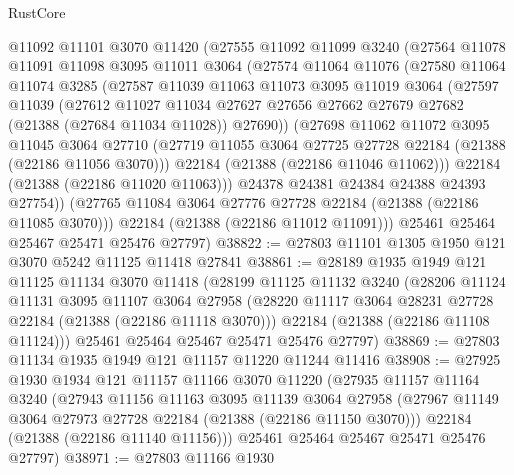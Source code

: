 \begin{lexlean}{RustCore}
\begin{coremodule}
    @11092
    @11101
    @3070
    @11420
    (@27555
      @11092
      @11099
      @3240
      (@27564
        @11078
        @11091
        @11098
        @3095
        @11011
        @3064
        (@27574
          @11064
          @11076
          (@27580
            @11064
            @11074
            @3285
            (@27587
              @11039
              @11063
              @11073
              @3095
              @11019
              @3064
              (@27597
                @11039
                (@27612
                  @11027
                  @11034
                  @27627
                  @27656
                  @27662
                  @27679
                  @27682
                  (@21388 (@27684 @11034 @11028))
                  @27690))
              (@27698
                @11062
                @11072
                @3095
                @11045
                @3064
                @27710
                (@27719 @11055 @3064 @27725 @27728 @22184 (@21388 (@22186 @11056 @3070)))
                @22184
                (@21388 (@22186 @11046 @11062)))
              @22184
              (@21388 (@22186 @11020 @11063)))
            @24378
            @24381
            @24384
            @24388
            @24393
            @27754))
        (@27765 @11084 @3064 @27776 @27728 @22184 (@21388 (@22186 @11085 @3070)))
        @22184
        (@21388 (@22186 @11012 @11091)))
      @25461
      @25464
      @25467
      @25471
      @25476
      @27797)
@38822 := @27803 @11101 @1305 @1950 @121 @3070 @5242 @11125 @11418 @27841
@38861 := @28189
    @1935
    @1949
    @121
    @11125
    @11134
    @3070
    @11418
    (@28199
      @11125
      @11132
      @3240
      (@28206
        @11124
        @11131
        @3095
        @11107
        @3064
        @27958
        (@28220 @11117 @3064 @28231 @27728 @22184 (@21388 (@22186 @11118 @3070)))
        @22184
        (@21388 (@22186 @11108 @11124)))
      @25461
      @25464
      @25467
      @25471
      @25476
      @27797)
@38869 := @27803 @11134 @1935 @1949 @121 @11157 @11220 @11244 @11416
@38908 := @27925
    @1930
    @1934
    @121
    @11157
    @11166
    @3070
    @11220
    (@27935
      @11157
      @11164
      @3240
      (@27943
        @11156
        @11163
        @3095
        @11139
        @3064
        @27958
        (@27967 @11149 @3064 @27973 @27728 @22184 (@21388 (@22186 @11150 @3070)))
        @22184
        (@21388 (@22186 @11140 @11156)))
      @25461
      @25464
      @25467
      @25471
      @25476
      @27797)
@38971 := @27803
    @11166
    @1930

\end{coremodule}
\end{lexlean}
